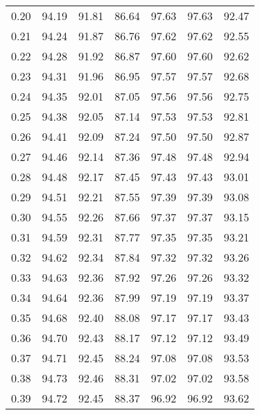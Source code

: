 \begin{tabular}{|c|c|c|c|c|c|c|}
      0.20 &     94.19 &     91.81 &      86.64 &   97.63 &      97.63 &         92.47 \\
      0.21 &     94.24 &     91.87 &      86.76 &   97.62 &      97.62 &         92.55 \\
      0.22 &     94.28 &     91.92 &      86.87 &   97.60 &      97.60 &         92.62 \\
      0.23 &     94.31 &     91.96 &      86.95 &   97.57 &      97.57 &         92.68 \\
      0.24 &     94.35 &     92.01 &      87.05 &   97.56 &      97.56 &         92.75 \\
      0.25 &     94.38 &     92.05 &      87.14 &   97.53 &      97.53 &         92.81 \\
      0.26 &     94.41 &     92.09 &      87.24 &   97.50 &      97.50 &         92.87 \\
      0.27 &     94.46 &     92.14 &      87.36 &   97.48 &      97.48 &         92.94 \\
      0.28 &     94.48 &     92.17 &      87.45 &   97.43 &      97.43 &         93.01 \\
      0.29 &     94.51 &     92.21 &      87.55 &   97.39 &      97.39 &         93.08 \\
      0.30 &     94.55 &     92.26 &      87.66 &   97.37 &      97.37 &         93.15 \\
      0.31 &     94.59 &     92.31 &      87.77 &   97.35 &      97.35 &         93.21 \\
      0.32 &     94.62 &     92.34 &      87.84 &   97.32 &      97.32 &         93.26 \\
      0.33 &     94.63 &     92.36 &      87.92 &   97.26 &      97.26 &         93.32 \\
      0.34 &     94.64 &     92.36 &      87.99 &   97.19 &      97.19 &         93.37 \\
      0.35 &     94.68 &     92.40 &      88.08 &   97.17 &      97.17 &         93.43 \\
      0.36 &     94.70 &     92.43 &      88.17 &   97.12 &      97.12 &         93.49 \\
      0.37 &     94.71 &     92.45 &      88.24 &   97.08 &      97.08 &         93.53 \\
      0.38 &     94.73 &     92.46 &      88.31 &   97.02 &      97.02 &         93.58 \\
      0.39 &     94.72 &     92.45 &      88.37 &   96.92 &      96.92 &         93.62 \\

\end{tabular}
